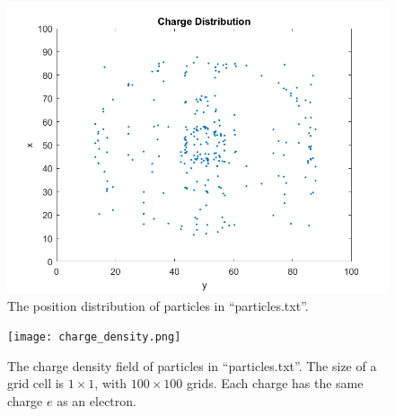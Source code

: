\documentclass[12pt, graphicx]{article}
\begin{document}
\begin{figure}[ht]
\centering
\includegraphics[width = 120mm]{charges.png}
\caption{The position distribution of particles in \textquotedblleft particles.txt\textquotedblright.}
\label{fig:charge}
\end{figure}

\clearpage

\begin{figure}[ht]
\centering
\texttt{[image: charge\_density.png]}
\caption{The charge density field of particles in \textquotedblleft particles.txt\textquotedblright. The size of a grid cell is $1\times1$, with $100\times100$ grids. Each charge has the same charge $e$ as an electron.}
\label{fig:density}
\end{figure}
\end{document}
